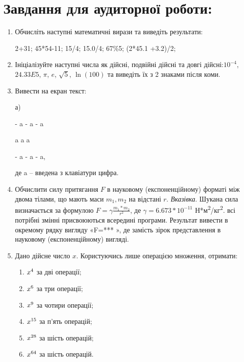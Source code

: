 \documentclass[a5paper,titlepage,openany,twoside,draft]{book_unv}%
\makeatletter
\newcommand{\xslalph}[1]{\expandafter\@xslalph\csname c@#1\endcsname}
\newcommand{\@xslalph}[1]{%
    \ifcase#1\or а\or б\or в\or г\or д\or e\or є\or ж\or з\or i%
    \or й\or к\or л\or м\or н\or о\or п\or р\or с\or т%
    \or у\or ф\or х\or ц\or ч\or ш\or ю\or я\or аа\or бб\or вв%
    \else\@ctrerr\fi%
}
\makeatother
\begin{document}
\section{Завдання для аудиторної роботи:}

\begin{enumerate}
\def\labelenumi{\arabic{enumi}.}
\item
Обчисліть наступні математичні вирази та виведіть результати:

2+31; 45*54-11; 15/4; 15.0/4; 67\%5; (2*45.1 +3.2)/2;

\item
Ініціалізуйте наступні числа як дійсні, подвійні дійсні та довгі
дійсні:$10^{-4}$, $24.33E5$, $\pi$, $e$, $\sqrt{5}$,
$\ln(100)$ та виведіть їх з 2 знаками після коми.

\item
Вивести на екран текст:

а)

-\/ a -\/ a -\/ a

a \textbar{} a \textbar{} a

-\/ a -\/ a -\/ a,

де a -- введена з клавіатури цифра.

\item
Обчислити силу притягання $F$ в науковому (експоненційному) форматі між двома тілами,
що мають маси $m_{1},m_{2}$ на відстані $r$.
\emph{\emph{Вказівка}}. Шукана сила визначається за формулою
$ F=\gamma \frac{m_{1}*m_{2}}{r^{2}}$,
де $\gamma = 6.673*10^{-11}$ Н*м\textsuperscript{2}/кг\textsuperscript{2}. всі потрібні змінні
присвоюються всередині програми. Результат вивести в окремому рядку
вигляду «F=*** », де замість зірок представлення в науковому
(експоненційному) вигляді.

\item
Дано дійсне число \(x\). Користуючись лише операцією множення,
отримати:
\begin{multicols}{2}
\begin{enumerate}[label=\xslalph*)]
\item \(x\textsuperscript{4}\) за дві операції;
\item \(x\textsuperscript{6}\) за три операції;
\item \(x\textsuperscript{9}\) за чотири операції;
\item \(x\textsuperscript{15}\) за п'ять операцій;
\item \(x\textsuperscript{28}\) за шість операцій;
\item \(x\textsuperscript{64}\) за шість операцій.
\end{enumerate}
\end{multicols}


\end{enumerate}
\end{document}
